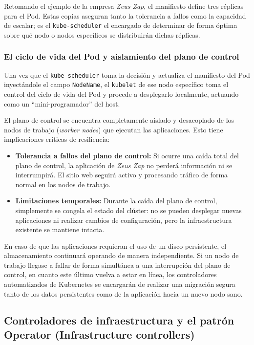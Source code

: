 Retomando el ejemplo de la empresa \textit{Zeus Zap}, el manifiesto define tres réplicas para el Pod. Estas copias aseguran tanto la tolerancia a fallos como la capacidad de escalar; es el \texttt{kube-scheduler} el encargado de determinar de forma óptima sobre qué nodo o nodos específicos se distribuirán dichas réplicas.

\subsubsection{El ciclo de vida del Pod y aislamiento del plano de control}
Una vez que el \texttt{kube-scheduler} toma la decisión y actualiza el manifiesto del Pod inyectándole el campo \texttt{NodeName}, el \texttt{kubelet} de ese nodo específico toma el control del ciclo de vida del Pod y procede a desplegarlo localmente, actuando como un ``mini-programador'' del host.

El plano de control se encuentra completamente aislado y desacoplado de los nodos de trabajo (\textit{worker nodes}) que ejecutan las aplicaciones. Esto tiene implicaciones críticas de resiliencia:
\begin{itemize}
    \item \textbf{Tolerancia a fallos del plano de control:} Si ocurre una caída total del plano de control, la aplicación de \textit{Zeus Zap} no perderá información ni se interrumpirá. El sitio web seguirá activo y procesando tráfico de forma normal en los nodos de trabajo.
    \item \textbf{Limitaciones temporales:} Durante la caída del plano de control, simplemente se congela el estado del clúster: no se pueden desplegar nuevas aplicaciones ni realizar cambios de configuración, pero la infraestructura existente se mantiene intacta.
\end{itemize}

En caso de que las aplicaciones requieran el uso de un disco persistente, el almacenamiento continuará operando de manera independiente. Si un nodo de trabajo llegase a fallar de forma simultánea a una interrupción del plano de control, en cuanto este último vuelva a estar en línea, los controladores automatizados de Kubernetes se encargarán de realizar una migración segura tanto de los datos persistentes como de la aplicación hacia un nuevo nodo sano.

\subsection{Controladores de infraestructura y el patrón Operator (Infrastructure controllers)}

